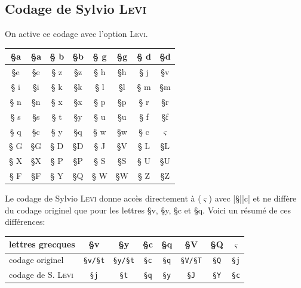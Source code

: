 \documentclass[full, french]{l3doc}
\newcommand\Option[1]{\textsc{#1}}
\begin{document}
\pagebreak[4]

\subsection{Codage de Sylvio \textsc{Levi}}

On active ce codage avec l'option \Option{Levi}.

\begin{center}\Large
\begin{ParesseActive} \label{codagelevi}
\begin{tabular}{*4{||>{\ttfamily \S}c|c}||}\hline
a & §a & b & §b & g & §g & d & §d\\ \hline
e & §e & z & §z & h & §h & j & §v\\ \hline
i & §i & k & §k & l & §l & m & §m\\ \hline
n & §n & x & §x & p & §p & r & §r\\ \hline
s & §s & t & §y & u & §u & f & §f\\ \hline
q & §c & y & §q & w & §w & c & \(\varsigma\)\\ \hline\hline
G & §G & D & §D & J & §V & L & §L\\ \hline
X & §X & P & §P & S & §S & U & §U\\ \hline
F & §F & Y & §Q & W & §W & Z & §Z\\ \hline
\end{tabular}
\end{ParesseActive}
\end{center}

Le codage de Sylvio \textsc{Levi} donne accès directement à 
(\(\varsigma\)) avec |§||c| et ne diffère du codage originel que pour
les lettres {\ActiveLaParesse §v, §y, §c et §q}. Voici un résumé de
ces différences:

\begin{center}
\newcommand\CT[1]{\multicolumn{1}{c|}{\texttt{#1}}}
\begin{ParesseActive}
\begin{tabular}{|l|*{7}{c|}}\hline
lettres grecques
& §v & §y & §c & §q & §V & §Q & \(\varsigma\)\\\hline
codage originel
&\CT{\S{}v/\S{}t}&\CT{\S{}y/\S{}t}&\CT{\S{}c}
&\CT{\S{}q}&\CT{\S{}V/\S{}T}&\CT{\S{}Q}& \CT{\S{}j} \\\hline
codage de S. \textsc{Levi}
&\CT{\S{}j}&\CT{\S{}t}&\CT{\S{}q}&\CT{\S{}y}
&\CT{\S{}J}&\CT{\S{}Y} & \CT{\S{}c}\\\hline
\end{tabular}
\end{ParesseActive}
\end{center}
\end{document}
